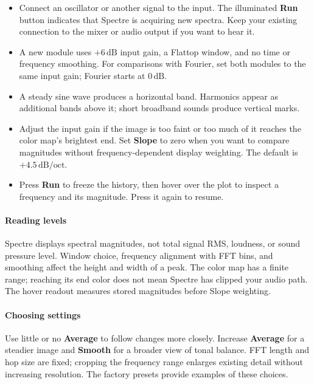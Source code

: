 \documentclass[12pt,letterpaper]{article}
\begin{document}
\begin{itemize}
  \item Connect an oscillator or another signal to the input. The illuminated
  \textbf{Run} button indicates that Spectre is acquiring new spectra.
  Keep your existing connection to the mixer or audio output if you want to
hear it.
  \item A new module uses $+6\,\mathrm{dB}$ input gain, a Flattop window,
  and no time or frequency smoothing. For comparisons with Fourier, set
  both modules to the same input gain; Fourier starts at $0\,\mathrm{dB}$.
  \item A steady sine wave produces a horizontal band. Harmonics appear as
  additional bands above it; short broadband sounds produce vertical marks.
  \item Adjust the input gain if the image is too faint or too much of it
  reaches the color map's brightest end. Set \textbf{Slope} to zero when you
  want to compare magnitudes without frequency-dependent display weighting.
  The default is $+4.5\,\mathrm{dB/oct}$.
  \item Press \textbf{Run} to freeze the history, then hover over the plot to
  inspect a frequency and its magnitude. Press it again to resume.
\end{itemize}

\paragraph{Reading levels} Spectre displays spectral magnitudes, not total
signal RMS, loudness, or sound pressure level. Window choice, frequency
alignment with FFT bins, and smoothing affect the height and width of a peak.
The color map has a finite range; reaching its end color does not mean Spectre
has clipped your audio path. The hover readout measures stored magnitudes
before Slope weighting.

\paragraph{Choosing settings} Use little or no \textbf{Average} to follow
changes more closely. Increase \textbf{Average} for a steadier image and
\textbf{Smooth} for a broader view of tonal balance. FFT length and hop size
are fixed; cropping the frequency range enlarges existing detail without
increasing resolution. The factory presets provide examples of these choices.

\end{document}
